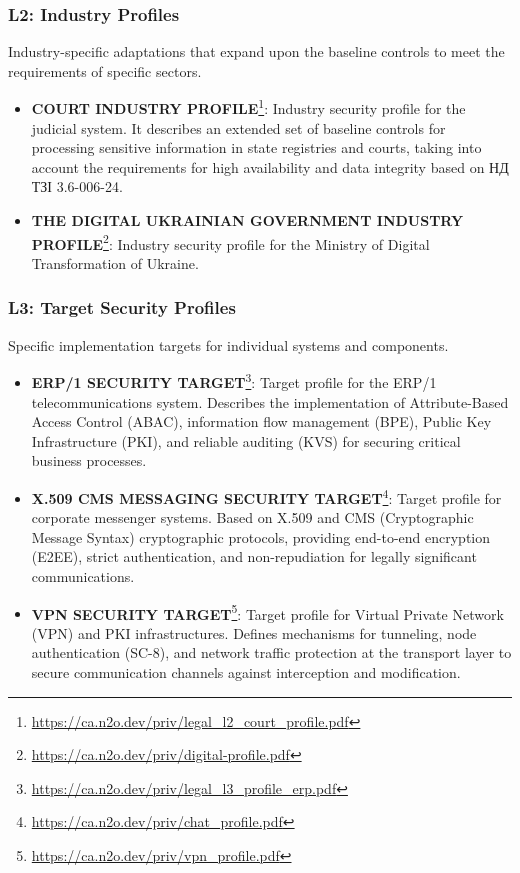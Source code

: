 \documentclass{article}
\begin{document}
\subsubsection{L2: Industry Profiles}
Industry-specific adaptations that expand upon the baseline controls to meet the requirements of specific sectors.
\begin{itemize}
    \item \textbf{COURT INDUSTRY PROFILE}\footnote{\url{https://ca.n2o.dev/priv/legal_l2_court_profile.pdf}}:
      Industry security profile for the judicial system. It describes an extended set of baseline controls for
      processing sensitive information in state registries and courts, taking into account the requirements for
      high availability and data integrity based on \foreignlanguage{ukrainian}{\foreignlanguage{ukrainian}{НД \foreignlanguage{ukrainian}{ТЗІ}} 3.6-006-24}.
    \item \textbf{THE DIGITAL UKRAINIAN GOVERNMENT INDUSTRY PROFILE}\footnote{\url{https://ca.n2o.dev/priv/digital-profile.pdf}}:
      Industry security profile for the Ministry of Digital Transformation of Ukraine.
\end{itemize}

\subsubsection{L3: Target Security Profiles}
Specific implementation targets for individual systems and components.
\begin{itemize}
    \item \textbf{ERP/1 SECURITY TARGET}\footnote{\url{https://ca.n2o.dev/priv/legal_l3_profile_erp.pdf}}:
      Target profile for the ERP/1 telecommunications system. Describes the implementation of Attribute-Based
      Access Control (ABAC), information flow management (BPE), Public Key Infrastructure (PKI), and reliable
      auditing (KVS) for securing critical business processes.
    \item \textbf{X.509 CMS MESSAGING SECURITY TARGET}\footnote{\url{https://ca.n2o.dev/priv/chat_profile.pdf}}:
      Target profile for corporate messenger systems. Based on X.509 and CMS (Cryptographic Message Syntax)
      cryptographic protocols, providing end-to-end encryption (E2EE), strict authentication, and non-repudiation
      for legally significant communications.
    \item \textbf{VPN SECURITY TARGET}\footnote{\url{https://ca.n2o.dev/priv/vpn_profile.pdf}}:
      Target profile for Virtual Private Network (VPN) and PKI infrastructures. Defines mechanisms for tunneling,
      node authentication (SC-8), and network traffic protection at the transport layer to secure communication
      channels against interception and modification.
\end{itemize}
\end{document}

